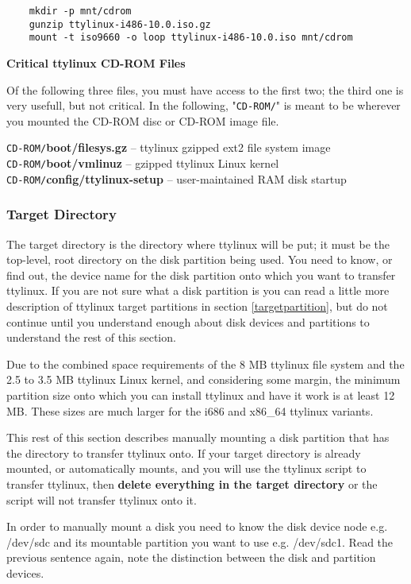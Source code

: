 \documentclass[10pt]{article}
\begin{document}
\begin{lstlisting}
	mkdir -p mnt/cdrom
	gunzip ttylinux-i486-10.0.iso.gz
	mount -t iso9660 -o loop ttylinux-i486-10.0.iso mnt/cdrom
\end{lstlisting}

{\bf Critical ttylinux CD-ROM Files}

Of the following three files, you must have access to the first two; the third
one is very usefull, but not critical. In the following, "{\tt CD-ROM/}" is
meant to be wherever you mounted the CD-ROM disc or CD-ROM image file.

{\tt CD-ROM/}{\bf boot/filesys.gz} -- ttylinux gzipped ext2 file system image\\
{\tt CD-ROM/}{\bf boot/vmlinuz} -- gzipped ttylinux Linux kernel\\
{\tt CD-ROM/}{\bf config/ttylinux-setup} -- user-maintained RAM disk startup

\subsubsection{Target Directory}

The target directory is the directory where ttylinux will be put; it must be
the top-level, root directory on the disk partition being used. You need to
know, or find out, the device name for the disk partition onto which you want
to transfer ttylinux. If you are not sure what a disk partition is you can read
a little more description of ttylinux target partitions in section
\ref{targetpartition}, but do not continue until you understand enough about
disk devices and partitions to understand the rest of this section.

Due to the combined space requirements of the 8 MB ttylinux file system and the
2.5 to 3.5 MB ttylinux Linux kernel, and considering some margin, the minimum
partition size onto which you can install ttylinux and have it work is at least
12 MB. These sizes are much larger for the i686 and x86\_64 ttylinux variants.

This rest of this section describes manually mounting a disk partition that has
the directory to transfer ttylinux onto. If your target directory is already
mounted, or automatically mounts, and you will use the ttylinux script to
transfer ttylinux, then {\bf delete everything in the target directory} or the
script will not transfer ttylinux onto it.

In order to manually mount a disk you need to know the disk device node e.g.
/dev/sdc and its mountable partition you want to use e.g. /dev/sdc1. Read the
previous sentence again, note the distinction between the disk and partition
devices.
\end{document}
